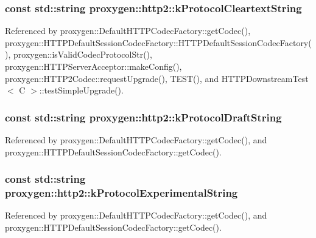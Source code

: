 \subsubsection[{k\+Protocol\+Cleartext\+String}]{\setlength{\rightskip}{0pt plus 5cm}const std\+::string proxygen\+::http2\+::k\+Protocol\+Cleartext\+String}\label{namespaceproxygen_1_1http2_a4a4530236990b959d14d8a16d91d99cb}


Referenced by proxygen\+::\+Default\+H\+T\+T\+P\+Codec\+Factory\+::get\+Codec(), proxygen\+::\+H\+T\+T\+P\+Default\+Session\+Codec\+Factory\+::\+H\+T\+T\+P\+Default\+Session\+Codec\+Factory(), proxygen\+::is\+Valid\+Codec\+Protocol\+Str(), proxygen\+::\+H\+T\+T\+P\+Server\+Acceptor\+::make\+Config(), proxygen\+::\+H\+T\+T\+P2\+Codec\+::request\+Upgrade(), T\+E\+S\+T(), and H\+T\+T\+P\+Downstream\+Test$<$ C $>$\+::test\+Simple\+Upgrade().

\subsubsection[{k\+Protocol\+Draft\+String}]{\setlength{\rightskip}{0pt plus 5cm}const std\+::string proxygen\+::http2\+::k\+Protocol\+Draft\+String}\label{namespaceproxygen_1_1http2_ab7c60bfe17cbc7e26846ae904ecf3085}


Referenced by proxygen\+::\+Default\+H\+T\+T\+P\+Codec\+Factory\+::get\+Codec(), and proxygen\+::\+H\+T\+T\+P\+Default\+Session\+Codec\+Factory\+::get\+Codec().

\subsubsection[{k\+Protocol\+Experimental\+String}]{\setlength{\rightskip}{0pt plus 5cm}const std\+::string proxygen\+::http2\+::k\+Protocol\+Experimental\+String}\label{namespaceproxygen_1_1http2_acc27f73a013f8c20468a4394ec5701ea}


Referenced by proxygen\+::\+Default\+H\+T\+T\+P\+Codec\+Factory\+::get\+Codec(), and proxygen\+::\+H\+T\+T\+P\+Default\+Session\+Codec\+Factory\+::get\+Codec().

